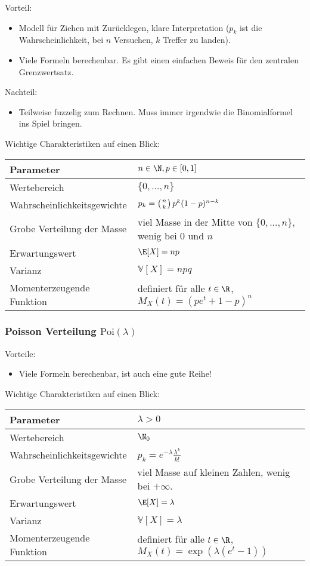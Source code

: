 {Vorteil:} 
\begin{itemize}
	\item Modell f\"ur Ziehen mit Zur\"ucklegen, klare Interpretation ($p_k$ ist die Wahrscheinlichkeit, bei $n$ Versuchen, $k$ Treffer zu landen).
	\item Viele Formeln berechenbar. Es gibt einen einfachen Beweis f\"ur den zentralen Grenzwertsatz.
\end{itemize}
Nachteil:
\begin{itemize}
 	\item Teilweise fuzzelig zum Rechnen. Muss immer irgendwie die Binomialformel ins Spiel bringen.
\end{itemize}
Wichtige Charakteristiken auf einen Blick:
\begin{center}
\begin{tabular}[h]{|l|l|}
\hline
Parameter& $n\in \N, p\in [0,1]$ \\
\hline
Wertebereich & $\{0,...,n\}$\\
\hline
Wahrscheinlichkeitsgewichte& $p_k=\left(n\atop k\right) p^k(1-p)^{n-k}$\\
\hline
Grobe Verteilung der Masse & viel Masse in der Mitte von $\{0,...,n\}$, wenig bei $0$ und $n$\\
\hline
Erwartungswert& $\E[X]=np $ \\
\hline
Varianz & $\mathbb V[X]=npq$\\
\hline
Momenterzeugende Funktion& definiert f\"ur alle $t\in \R$, $M_X(t)=(pe^t+1-p)^n$\\
\hline
\end{tabular}
\end{center}


\subsubsection*{Poisson Verteilung $\text{Poi}(\lambda)$}

{Vorteile:} 
\begin{itemize}
	\item Viele Formeln berechenbar, ist auch eine gute Reihe!
\end{itemize}


Wichtige Charakteristiken auf einen Blick:
\begin{center}
\begin{tabular}[h]{|l|l|}
\hline
Parameter& $\lambda>0$ \\
\hline
Wertebereich & $\N_0$\\
\hline
Wahrscheinlichkeitsgewichte& $p_k=e^{-\lambda} \frac{\lambda^k}{k!}$\\
\hline
Grobe Verteilung der Masse & viel Masse auf kleinen Zahlen, wenig bei $+\infty$.\\
\hline
Erwartungswert& $\E[X]=\lambda$ \\
\hline
Varianz & $\mathbb V[X]=\lambda$\\
\hline
Momenterzeugende Funktion& definiert f\"ur alle $t\in \R$, $M_X(t)=\exp(\lambda(e^t-1))$\\
\hline
\end{tabular}
\end{center}



